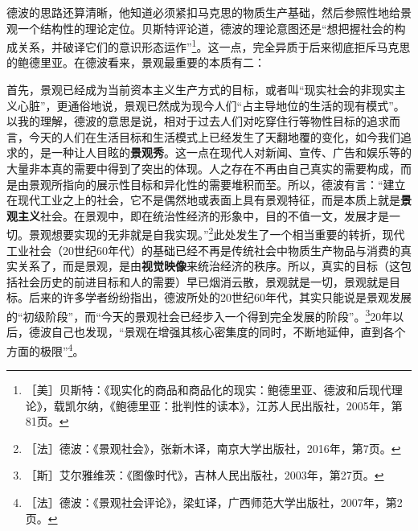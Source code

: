 \documentclass[fontset=fandol, a4paper, 12pt, openright]{ctexbook}
\begin{document}
德波的思路还算清晰，他知道必须紧扣马克思的物质生产基础，然后参照性地给景观一个结构性的理论定位。{\kaishu 贝斯特评论道，德波的理论意图还是“想把握社会的构成关系，并破译它们的意识形态运作”\footnote{［美］贝斯特：《现实化的商品和商品化的现实：鲍德里亚、德波和后现代理论》，载凯尔纳，《鲍德里亚：批判性的读本》，江苏人民出版社，2005年，第81页。}。这一点，完全异质于后来彻底拒斥马克思的鲍德里亚。}在德波看来，景观最重要的本质有二：

首先，景观已经成为当前资本主义生产方式的目标，或者叫“现实社会的非现实主义心脏”，更通俗地说，景观已然成为现今人们“占主导地位的生活的现有模式”。以我的理解，德波的意思是说，相对于过去人们对吃穿住行等物性目标的追求而言，今天的人们在生活目标和生活模式上已经发生了天翻地覆的变化，如今我们追求的，是一种让人目眩的\textbf{景观秀}。这一点在现代人对新闻、宣传、广告和娱乐等的大量非本真的需要中得到了突出的体现。人之存在不再由自己真实的需要构成，而是由景观所指向的展示性目标和异化性的需要堆积而至。所以，德波有言：“建立在现代工业之上的社会，它不是偶然地或表面上具有景观特征，而是本质上就是\textbf{景观主义}社会。在景观中，即在统治性经济的形象中，目的不值一文，发展才是一切。景观想要实现的无非就是自我实现。”\footnote{［法］德波：《景观社会》，张新木译，南京大学出版社，2016年，第7页。}此处发生了一个相当重要的转折，现代工业社会（20世纪60年代）的基础已经不再是传统社会中物质生产物品与消费的真实关系了，而是景观，是由\textbf{视觉映像}来统治经济的秩序。所以，真实的目标（这包括社会历史的前进目标和人的需要）早已烟消云散，景观就是一切，景观就是目标。{\kaishu 后来的许多学者纷纷指出，德波所处的20世纪60年代，其实只能说是景观发展的“初级阶段”，而“今天的景观社会已经步入一个得到完全发展的阶段”。\footnote{［斯］艾尔雅维茨：《图像时代》，吉林人民出版社，2003年，第27页。}20年以后，德波自己也发现，“景观在增强其核心密集度的同时，不断地延伸，直到各个方面的极限”\footnote{［法］德波：《景观社会评论》，梁虹译，广西师范大学出版社，2007年，第2页。}。}
\end{document}
